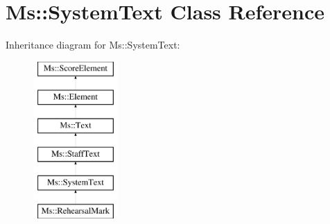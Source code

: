 \hypertarget{class_ms_1_1_system_text}{}\section{Ms\+:\+:System\+Text Class Reference}
\label{class_ms_1_1_system_text}
Inheritance diagram for Ms\+:\+:System\+Text\+:\begin{figure}[H]
\begin{center}
\leavevmode
\includegraphics[height=6.000000cm]{class_ms_1_1_system_text}
\end{center}
\end{figure}
